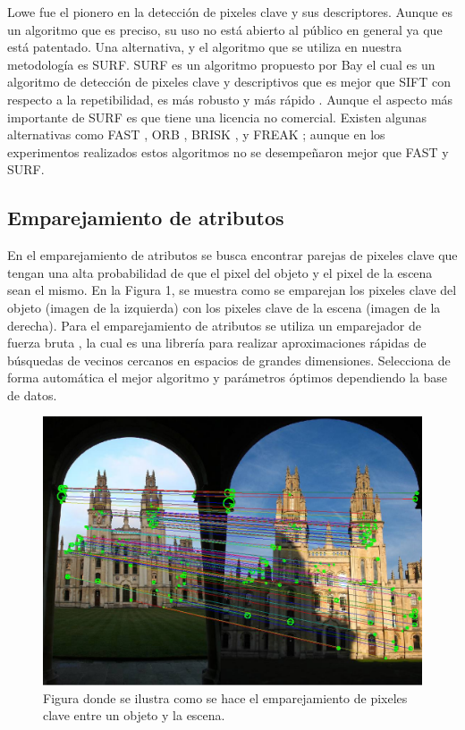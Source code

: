 \documentclass[a4paper]{article}
\begin{document}
Lowe \cite{lowe2004distinctive} fue el pionero en la detección de pixeles clave y sus descriptores. Aunque es un algoritmo que es preciso, su uso no está abierto al público en general ya que está patentado. Una alternativa, y el algoritmo que se utiliza en nuestra metodología es SURF. SURF es un algoritmo propuesto por Bay \cite{bay2006surf} el cual es un algoritmo de detección de pixeles clave y descriptivos que es mejor que SIFT con respecto a la repetibilidad, es más robusto y más rápido \cite{bay2006surf}. Aunque el aspecto más importante de SURF es que tiene una licencia no comercial. Existen algunas alternativas como FAST \cite{trajkovic1998fast}, ORB \cite{rublee2011orb}, BRISK \cite{leutenegger2011brisk}, y FREAK \cite{alahi2012freak}; aunque en los experimentos realizados estos algoritmos no se desempeñaron mejor que FAST y SURF.

\subsection{Emparejamiento de atributos}
En el emparejamiento de atributos se busca encontrar parejas de pixeles clave que tengan una alta probabilidad de que el pixel del objeto y el pixel de la escena sean el mismo. En la Figura 1, se muestra como se emparejan los pixeles clave del objeto (imagen de la izquierda) con los pixeles clave de la escena (imagen de la derecha). Para el emparejamiento de atributos se utiliza un emparejador de fuerza bruta \cite{muja2009fast, muja2012fast, muja2014scalable}, la cual es una librería para realizar aproximaciones rápidas de búsquedas de vecinos cercanos en espacios de grandes dimensiones. Selecciona de forma automática el mejor algoritmo y parámetros óptimos dependiendo la base de datos. 

\begin{figure}
  \centering
  \includegraphics[width=\textwidth]{matching}
  \caption{Figura donde se ilustra como se hace el emparejamiento de pixeles clave entre un objeto y la escena.}
\end{figure}
\end{document}
